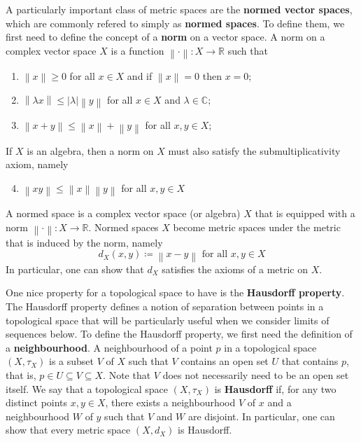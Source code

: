 \documentclass{article}
\theoremstyle{plain}
\theoremstyle{definition}
\theoremstyle{remark}
\newcommand{\norm}[1]{\left\lVert#1\right\rVert}
\begin{document}
A particularly important class of metric spaces are the 
\textbf{normed vector spaces}, 
which are commonly refered to simply as \textbf{normed spaces}.
To define them, we first need to define the concept of a \textbf{norm}
on a vector space.
A norm on a complex vector space $X$ is a function 
$\norm{\cdot} : X \rightarrow \mathbb{R}$ such that
\begin{enumerate}
	\item $\norm{x} \geq 0$ for all $x \in X$
		and if $\norm{x} = 0$ then $x = 0$;
	\item $\norm{{\lambda}x} \leq \lvert \lambda \rvert \norm{y}$ for all 
		 $x \in X$ and $\lambda \in \mathbb{C}$;
	\item $\norm{x + y} \leq \norm{x} + \norm{y}$ for all $x, y \in X$;
\end{enumerate}
If $X$ is an algebra, then a norm on $X$ must also satisfy the submultiplicativity 
axiom, namely
\begin{enumerate}
	\setcounter{enumi}{3}
	\item $\norm{xy} \leq \norm{x}\norm{y}$ for all $x, y \in X$ 
\end{enumerate}
A normed space is a complex vector space (or algebra) $X$ 
that is equipped with a norm $\norm{\cdot} : X \rightarrow \mathbb{R}$.
Normed spaces $X$ become metric spaces under the metric that is induced by the norm, namely
\begin{equation}
	d_X(x,y) \coloneqq \norm{x - y} \text{ for all } x, y \in X
\end{equation}
In particular, one can show that $d_X$ satisfies the axioms of a metric on $X$.

One nice property for a topological space to have is the \textbf{Hausdorff property}.
The Hausdorff property defines a notion of separation between points in a topological
space that will be particularly useful when we consider limits of sequences below.
To define the Hausdorff property, we first need the definition of a 
\textbf{neighbourhood}.
A neighbourhood of a point $p$ in a topological space $(X, \tau_X)$
is a subset $V$ of $X$ such that $V$ contains an open set $U$ that contains $p$,
that is, $p \in U \subseteq V \subseteq X$. Note that $V$ does not necessarily
need to be an open set itself.
We say that a topological space $(X, \tau_X)$ is \textbf{Hausdorff}
if, for any two distinct points $x, y \in X$,
there exists a neighbourhood $V$ of $x$ and a neighbourhood $W$ of $y$
such that $V$ and $W$ are disjoint.
In particular, one can show that every metric space $(X, d_X)$ is Hausdorff.
\end{document}
